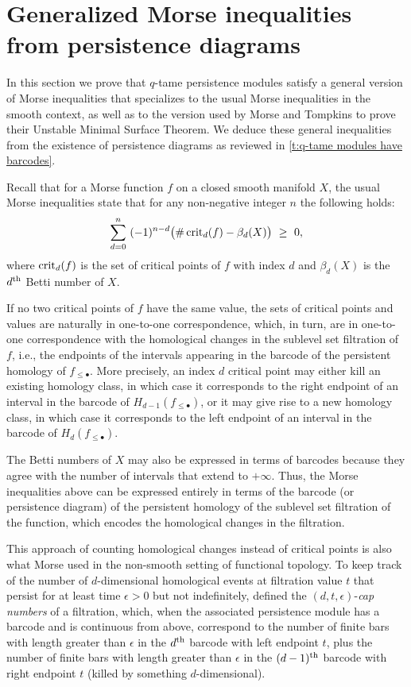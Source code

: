
\section{Generalized Morse inequalities from persistence diagrams} \label{s:inequalities}

In this section we prove that $q$-tame persistence modules satisfy a general version of Morse inequalities that specializes to the usual Morse inequalities in the smooth context, as well as to the version used by Morse and Tompkins to prove their Unstable Minimal Surface Theorem.
We deduce these general inequalities from the existence of persistence diagrams as reviewed in \cref{t:q-tame modules have barcodes}.

Recall that for a Morse function $f$ on a closed smooth manifold $X$, the usual Morse inequalities state that for any non-negative integer $n$ the following holds:
\begin{equation} \label{e:morse_inequalities}
\sum_{d=0}^n \ (-1)^{n-d} \big( \# \crit_{d}(f) - \beta_{d}(X) \big) \ \geq \ 0,
\end{equation}
where $\operatorname{crit}_{d}(f)$ is the set of critical points of $f$ with index $d$ and $\beta_{d}(X)$ is the $d^{\mathrm{th}}$ Betti number of $X$.

If no two critical points of $f$ have the same value, the sets of critical points and values are naturally in one-to-one correspondence, which, in turn, are in one-to-one correspondence with the homological changes in the sublevel set filtration of $f$, i.e., the endpoints of the intervals appearing in the barcode of the persistent homology of $f_{\leq \bullet}$.
More precisely, an index $d$ critical point may either kill an existing homology class, in which case it corresponds to the right endpoint of an interval in the barcode of $H_{d-1}(f_{\leq \bullet})$, or it may give rise to a new homology class, in which case it corresponds to the left endpoint of an interval in the barcode of $H_d(f_{\leq \bullet})$.

The Betti numbers of $X$ may also be expressed in terms of barcodes because they agree with the number of intervals that extend to $+\infty$.
Thus, the Morse inequalities above can be expressed entirely in terms of the barcode (or persistence diagram) of the persistent homology of the sublevel set filtration of the function, which encodes the homological changes in the filtration.

This approach of counting homological changes instead of critical points is also what Morse used in the non-smooth setting of functional topology.
To keep track of the number of $d$-dimensional homological events at filtration value $t$ that persist for at least time $\epsilon > 0$ but not indefinitely, \citet{Morse.1940} defined the $(d, t, \epsilon)$-\emph{cap numbers} of a filtration, which, when the associated persistence module has a barcode and is continuous from above, correspond to the number of finite bars with length greater than $\epsilon$ in the $d^{\mathrm{th}}$ barcode with left endpoint $t$, plus the number of finite bars with length greater than $\epsilon$ in the $(d-1)^{\mathrm{th}}$ barcode with right endpoint $t$ (killed by something $d$-dimensional).

